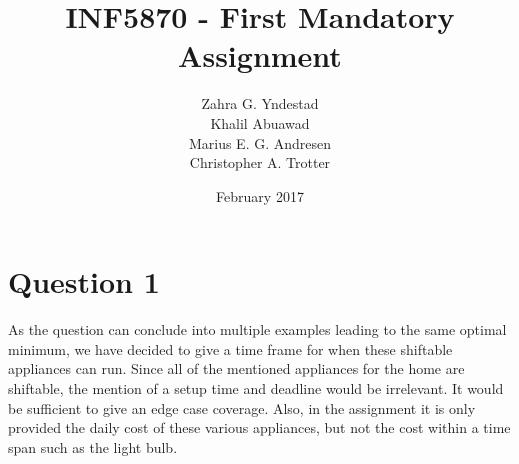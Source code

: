 \documentclass{article}
\title{INF5870 - First Mandatory Assignment}
\author{Zahra G. Yndestad \\ Khalil Abuawad \\ Marius E. G. Andresen \\ Christopher A. Trotter}
\date{February 2017}
\begin{document}

\section{Question 1}
	As the question can conclude into multiple examples leading to the same optimal minimum, we have decided to give a time frame for when these shiftable appliances can run. Since all of the mentioned appliances for the home are shiftable, the mention of a setup time and deadline would be irrelevant. It would be sufficient to give an edge case coverage. Also, in the assignment it is only provided the daily cost of these various appliances, but not the cost within a time span such as the light bulb.
\end{document}
